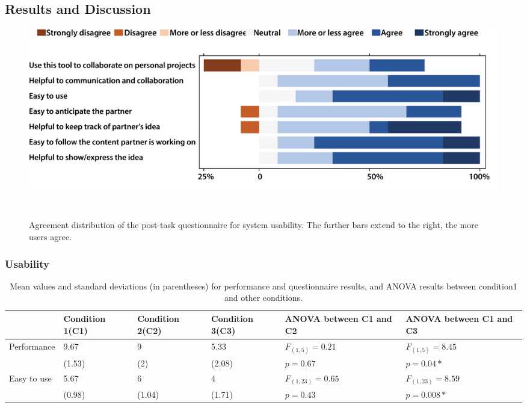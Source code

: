 \documentclass{sigchi}
\begin{document}
\subsection{Results and Discussion} 
\begin{figure}[tb!]
 \centering
 \includegraphics[width=0.98\columnwidth]{usability.png}
 \caption{Agreement distribution of the post-task questionnaire for system usability. The further bars extend to the right, the more users agree.
 }~\label{fig:usability}
\end{figure}
\subsubsection{Usability}

\begin{table}
  \centering
  \begin{tabular}{l p{2.8cm} p{2.8cm} p{2.8cm} p{2.8cm} p{2.8cm} }
    & Condition 1(C1) & Condition 2(C2) & Condition 3(C3) & ANOVA between C1 and C2 & ANOVA between C1 and C3 \\
    \midrule
    Performance & 9.67 & 9 & 5.33 & $F_{(1,5)} = 0.21$ & $F_{(1,5)} =8.45$ \\
     & (1.53) & (2) & (2.08) & $p = 0.67$ & $p = 0.04*$\\
    Easy to use & 5.67 & 6 & 4 & $F_{(1,23)}=0.65$  & $F_{(1,23)}=8.59$\\
     & (0.98) & (1.04) & (1.71) & $p=0.43$ & $p=0.008*$\\
  \end{tabular}
  \caption{Mean values and standard deviations (in parentheses) for performance and questionnaire results, and ANOVA results between condition1 and other conditions.}~\label{tab:result}
\end{table}
\end{document}
